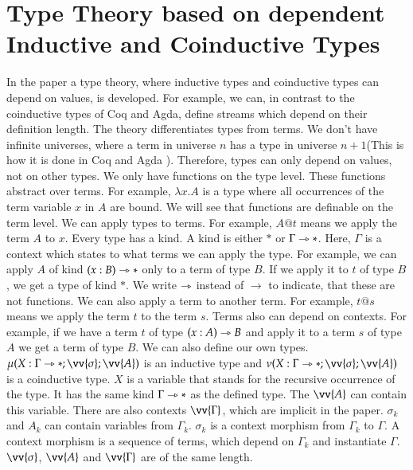 \documentclass[a4paper,cleardoubleempty,BCOR1cm]{scrbook}
\begin{document}
\chapter{Type Theory based on dependent Inductive and Coinductive Types}
\label{sec:org33f714d}
In the paper \cite{basold2016type} a type theory, where inductive types and
coinductive types can depend on values, is developed. For example, we can, in
contrast to the coinductive types of Coq and Agda, define streams which depend
on their definition length. The theory differentiates types from terms. We
don't have infinite universes, where a term in universe \(n\) has a type in
universe \(n+1\)(This is how it is done in Coq \cite{sozeau2014universe} and Agda
\cite{agdadocuniverselevels}). Therefore, types can only depend on values, not on
other types. We only have functions on the type level. These functions abstract
over terms. For example, \(\lambda x.A\) is a type where all occurrences of the
term variable \(x\) in \(A\) are bound.  We will see that functions are definable
on the term level. We can apply types to terms. For example, \(A @ t\) means we
apply the term \(A\) to \(x\). Every type has a kind. A kind is either \(*\) or
\(\Gamma\rightarrowtriangle*\). Here, \(\Gamma\) is a context which states to what terms we can
apply the type. For example, we can apply \(A\) of kind \((x:B)\rightarrowtriangle*\) only to a
term of type \(B\). If we apply it to \(t\) of type \(B\), we get a type of kind
\(*\). We write \(\rightarrowtriangle\) instead of \(\rightarrow\) to indicate, that these are not
functions. We can also apply a term to another term. For example, \(t@s\) means
we apply the term \(t\) to the term \(s\).  Terms also can depend on contexts.
For example, if we have a term \(t\) of type \((x:A)\rightarrowtriangle B\) and apply it to a term
\(s\) of type \(A\) we get a term of type \(B\).  We can also define our own types.
\(\mu(X:\Gamma\rat*;\vv{\sigma};\vv{A})\) is an inductive type and
\(\nu(X:\Gamma\rat*;\vv{\sigma};\vv{A})\) is a coinductive type. \(X\) is a
variable that stands for the recursive occurrence of the type. It has the
same kind \(\Gamma\rightarrowtriangle*\) as the defined type. The \(\vv{A}\) can contain this
variable. There are also contexts \(\vv{\Gamma}\), which are implicit in the
paper. \(\sigma_k\) and \(A_k\) can contain variables from \(\Gamma_k\). \(\sigma_k\)
is a context morphism from \(\Gamma_k\) to \(\Gamma\). A context morphism is a
sequence of terms, which depend on \(\Gamma_k\) and instantiate \(\Gamma\).
\(\vv{\sigma}\), \(\vv{A}\) and \(\vv{\Gamma}\) are of the same length.
\end{document}

